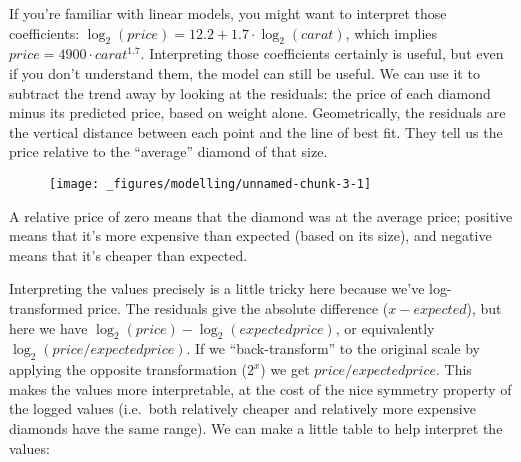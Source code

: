 If you're familiar with linear models, you might want to interpret those
coefficients: \(\log_2(price) = 12.2 + 1.7 \cdot \log_2(carat)\), which
implies \(price = 4900 \cdot carat ^ {1.7}\). Interpreting those
coefficients certainly is useful, but even if you don't understand them,
the model can still be useful. We can use it to subtract the trend away
by looking at the residuals: the price of each diamond minus its
predicted price, based on weight alone. Geometrically, the residuals are
the vertical distance between each point and the line of best fit. They
tell us the price relative to the ``average'' diamond of that size.

\begin{Shaded}
\end{Shaded}

\begin{figure}[H]
  \centering
  \texttt{[image: \_figures/modelling/unnamed-chunk-3-1]}
\end{figure}

A relative price of zero means that the diamond was at the average
price; positive means that it's more expensive than expected (based on
its size), and negative means that it's cheaper than expected.

Interpreting the values precisely is a little tricky here because we've
log-transformed price. The residuals give the absolute difference
(\(x - expected\)), but here we have
\(\log_2(price) - \log_2(expected price)\), or equivalently
\(\log_2(price / expected price)\). If we ``back-transform'' to the
original scale by applying the opposite transformation (\(2 ^ x\)) we
get \(price / expected price\). This makes the values more
interpretable, at the cost of the nice symmetry property of the logged
values (i.e.~both relatively cheaper and relatively more expensive
diamonds have the same range). We can make a little table to help
interpret the values:

